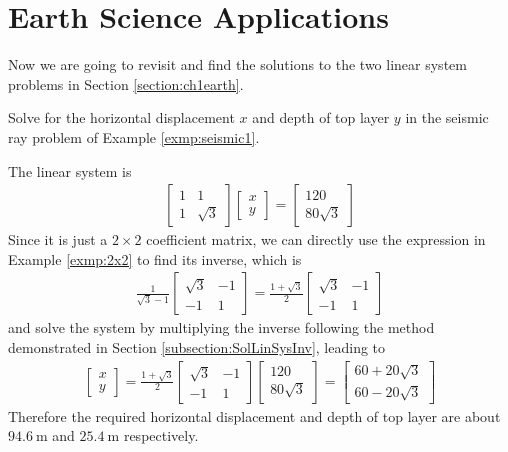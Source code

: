 \section{Earth Science Applications}
\label{section:ch3earth}
Now we are going to revisit and find the solutions to the two linear system problems in Section \ref{section:ch1earth}.
\begin{exmp}
Solve for the horizontal displacement $x$ and depth of top layer $y$ in the seismic ray problem of Example \ref{exmp:seismic1}.
\end{exmp}
\begin{solution}
The linear system is
\begin{align*}
\begin{bmatrix}
1 & 1 \\
1 & \sqrt{3}
\end{bmatrix}
\begin{bmatrix}
x \\
y
\end{bmatrix}
=
\begin{bmatrix}
120 \\
80\sqrt{3}
\end{bmatrix}
\end{align*}
Since it is just a $2 \times 2$ coefficient matrix, we can directly use the expression in Example \ref{exmp:2x2} to find its inverse, which is
\begin{align*}
\frac{1}{\sqrt{3}-1}
\begin{bmatrix}
\sqrt{3} & -1 \\
-1 & 1
\end{bmatrix}
=
\frac{1+\sqrt{3}}{2}
\begin{bmatrix}
\sqrt{3} & -1 \\
-1 & 1
\end{bmatrix}
\end{align*}
and solve the system by multiplying the inverse following the method demonstrated in Section \ref{subsection:SolLinSysInv}, leading to
\begin{align*}
\begin{bmatrix}
x \\
y
\end{bmatrix}
=
\frac{1+\sqrt{3}}{2}
\begin{bmatrix}
\sqrt{3} & -1 \\
-1 & 1
\end{bmatrix}
\begin{bmatrix}
120 \\
80\sqrt{3}
\end{bmatrix}
=
\begin{bmatrix}
60+20\sqrt{3}\\
60-20\sqrt{3}
\end{bmatrix}
\end{align*}
Therefore the required horizontal displacement and depth of top layer are about $\SI{94.6}{\m}$ and $\SI{25.4}{\m}$ respectively.
\end{solution}


